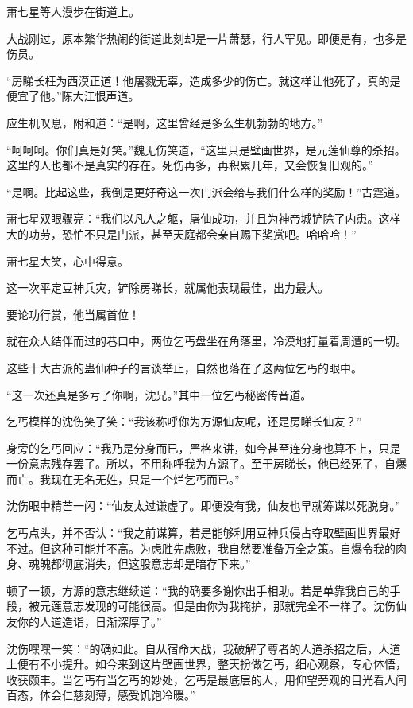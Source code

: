 
\begin{this_body}

萧七星等人漫步在街道上。

大战刚过，原本繁华热闹的街道此刻却是一片萧瑟，行人罕见。即便是有，也多是伤员。

“房睇长枉为西漠正道！他屠戮无辜，造成多少的伤亡。就这样让他死了，真的是便宜了他。”陈大江恨声道。

应生机叹息，附和道：“是啊，这里曾经是多么生机勃勃的地方。”

“呵呵呵。你们真是好笑。”魏无伤笑道，“这里只是壁画世界，是元莲仙尊的杀招。这里的人也都不是真实的存在。死伤再多，再积累几年，又会恢复旧观的。”

“是啊。比起这些，我倒是更好奇这一次门派会给与我们什么样的奖励！”古霆道。

萧七星双眼骤亮：“我们以凡人之躯，屠仙成功，并且为神帝城铲除了内患。这样大的功劳，恐怕不只是门派，甚至天庭都会亲自赐下奖赏吧。哈哈哈！”

萧七星大笑，心中得意。

这一次平定豆神兵灾，铲除房睇长，就属他表现最佳，出力最大。

要论功行赏，他当属首位！

就在众人结伴而过的巷口中，两位乞丐盘坐在角落里，冷漠地打量着周遭的一切。

这些十大古派的蛊仙种子的言谈举止，自然也落在了这两位乞丐的眼中。

“这一次还真是多亏了你啊，沈兄。”其中一位乞丐秘密传音道。

乞丐模样的沈伤笑了笑：“我该称呼你为方源仙友呢，还是房睇长仙友？”

身旁的乞丐回应：“我乃是分身而已，严格来讲，如今甚至连分身也算不上，只是一份意志残存罢了。所以，不用称呼我为方源了。至于房睇长，他已经死了，自爆而亡。我现在无名无姓，只是一个烂乞丐而已。”

沈伤眼中精芒一闪：“仙友太过谦虚了。即便没有我，仙友也早就筹谋以死脱身。”

乞丐点头，并不否认：“我之前谋算，若是能够利用豆神兵侵占夺取壁画世界最好不过。但这种可能并不高。为虑胜先虑败，我自然要准备万全之策。自爆令我的肉身、魂魄都彻底消失，但这股意志却是暗存下来。”

顿了一顿，方源的意志继续道：“我的确要多谢你出手相助。若是单靠我自己的手段，被元莲意志发现的可能很高。但是由你为我掩护，那就完全不一样了。沈伤仙友你的人道造诣，日渐深厚了。”

沈伤嘿嘿一笑：“的确如此。自从宿命大战，我破解了尊者的人道杀招之后，人道上便有不小提升。如今来到这片壁画世界，整天扮做乞丐，细心观察，专心体悟，收获颇丰。当乞丐有当乞丐的妙处，乞丐是最底层的人，用仰望旁观的目光看人间百态，体会仁慈刻薄，感受饥饱冷暖。”


\end{this_body}

